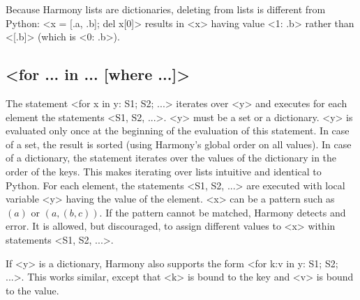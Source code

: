 \documentclass{report}
\begin{document}
Because Harmony lists are dictionaries, deleting from lists is different
from Python:
<{x = [.a, .b]; del x[0]}> results in <{x}> having value
<{{1: .b}}> rather than <{[.b]}> (which is <{{0: .b}}>).

\subsection*{<{for ... in ... [where ...]}>}

The statement <{for x in y: S1; S2; ...}>
iterates over <{y}> and executes for each element the statements
<{S1, S2, ...}>.
<{y}> must be a set or a dictionary.  <{y}> is evaluated only once at
the beginning of the evaluation of this statement.  In case of a set,
the result is sorted (using Harmony's global order on all values).
In case of a dictionary, the statement iterates over the values of
the dictionary in the order of the keys.  This makes iterating over
lists intuitive and identical to Python.
For each element, the statements <{S1, S2, ...}> are executed with
local variable <{y}> having the value of the element.
<{x}> can be a pattern such as $(a)$ or $(a, (b, c))$.
If the pattern cannot be matched, Harmony detects and error.
It is allowed, but discouraged, to assign different values to <{x}>
within statements <{S1, S2, ...}>.

If <{y}> is a dictionary, Harmony also supports the form
<{for k:v in y: S1; S2; ...}>.  This works similar,
except that <{k}> is bound to the key and <{v}> is bound to the value.
\end{document}
